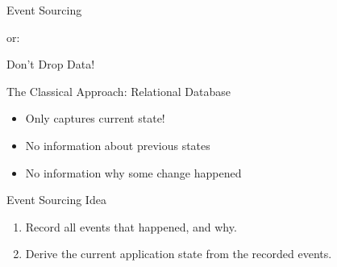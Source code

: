 \begin{frame}[fragile]{}

\begin{center}
{
\LARGE
Event Sourcing
}

\vspace{2em}

or:

\vspace{2em}

{
\Large
Don't Drop Data!
}
\end{center}
\end{frame}

\begin{frame}[fragile]{The Classical Approach: Relational Database}

\begin{itemize}                
\item Only captures current state!
\item No information about previous states
\item No information why some change happened
\end{itemize}
                   
\end{frame}

\begin{frame}[fragile]{Event Sourcing Idea}

\begin{enumerate}
\item Record all events that happened, and why.
\item Derive the current application state from the recorded events.
\end{enumerate}         



\end{frame}

